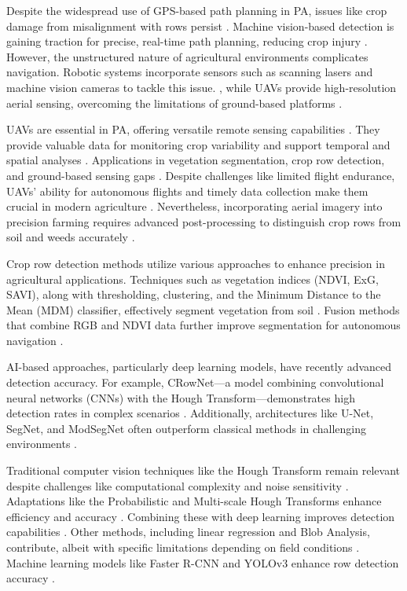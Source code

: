 \documentclass[conference]{IEEEtran}
\begin{document}
	Despite the widespread use of GPS-based path planning in PA, issues like crop damage from misalignment with rows persist \cite{b1}. Machine vision-based detection is gaining traction for precise, real-time path planning, reducing crop injury \cite{b1,b8}. However, the unstructured nature of agricultural environments complicates navigation. Robotic systems incorporate sensors such as scanning lasers and machine vision cameras to tackle this issue. \cite{b2,b3}, while UAVs provide high-resolution aerial sensing, overcoming the limitations of ground-based platforms \cite{b10}.
	
	UAVs are essential in PA, offering versatile remote sensing capabilities \cite{b9,b12}. They provide valuable data for monitoring crop variability and support temporal and spatial analyses \cite{b10,b12}. Applications in vegetation segmentation, crop row detection, and ground-based sensing gaps \cite{b7,b13}. Despite challenges like limited flight endurance, UAVs' ability for autonomous flights and timely data collection make them crucial in modern agriculture \cite{b11,b13}. Nevertheless, incorporating aerial imagery into precision farming requires advanced post-processing to distinguish crop rows from soil and weeds accurately \cite{b6}.
	
	Crop row detection methods utilize various approaches to enhance precision in agricultural applications. Techniques such as vegetation indices (NDVI, ExG, SAVI), along with thresholding, clustering, and the Minimum Distance to the Mean (MDM) classifier, effectively segment vegetation from soil \cite{b1,b6,b13}. Fusion methods that combine RGB and NDVI data further improve segmentation for autonomous navigation \cite{b5}.
	
	AI-based approaches, particularly deep learning models, have recently advanced detection accuracy. For example, CRowNet—a model combining convolutional neural networks (CNNs) with the Hough Transform—demonstrates high detection rates in complex scenarios \cite{b8,b14}. Additionally, architectures like U-Net, SegNet, and ModSegNet often outperform classical methods in challenging environments \cite{b5,b13}.
	
	Traditional computer vision techniques like the Hough Transform remain relevant despite challenges like computational complexity and noise sensitivity \cite{b2,b15}. Adaptations like the Probabilistic and Multi-scale Hough Transforms enhance efficiency and accuracy \cite{b2}. Combining these with deep learning improves detection capabilities \cite{b8}. Other methods, including linear regression and Blob Analysis, contribute, albeit with specific limitations depending on field conditions \cite{b2,b3}. Machine learning models like Faster R-CNN and YOLOv3 enhance row detection accuracy \cite{b2,b5}.
	
\end{document}
